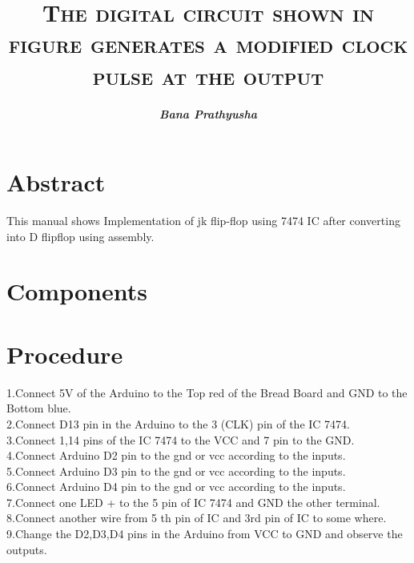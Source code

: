 \documentclass[jornal,10pt,twocolumn]{article}
\title{\textbf{\textsc{The digital circuit shown in figure generates a modified clock pulse at the output}}}
\author{\textit{\textbf{Bana Prathyusha}}}
\begin{document}
\maketitle
\section{Abstract}
This manual shows Implementation of jk flip-flop using 7474 IC after converting into D flipflop using assembly.
\section{Components}
\begin{table}[ht]
\caption{}
\label{Tabel-1}
\end{table}
\section{Procedure}
1.Connect 5V  of the Arduino to the Top red of the Bread Board  and GND to the Bottom blue.
\\
2.Connect D13 pin in the Arduino to the 3 (CLK) pin of the IC 7474.
\\
3.Connect 1,14  pins of the IC 7474 to the VCC and 7 pin to the GND.
\\
4.Connect  Arduino D2 pin to the gnd or vcc according to the inputs.
\\
5.Connect Arduino D3 pin to the gnd or vcc according to the inputs.
\\
6.Connect Arduino D4 pin to the gnd or vcc according to the inputs.
\\
7.Connect one LED + to the 5 pin of IC 7474 and GND the other terminal.
\\
8.Connect another wire from 5 th pin of IC and 3rd pin of IC to some where.\\
9.Change the D2,D3,D4 pins in the Arduino  from VCC to GND and observe the outputs.
\\
\end{document}
